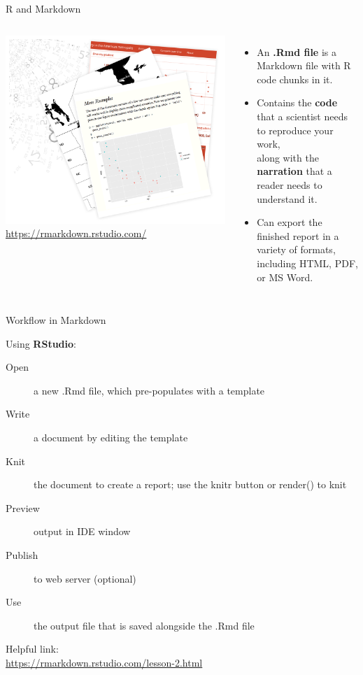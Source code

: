 \documentclass{beamer}
\begin{document}
\begin{frame}{R and Markdown}
\begin{columns}[t, onlytextwidth]

\vfill
\includegraphics[width=\textwidth]{markdown-examples.png}
\vfill
{\footnotesize \url{https://rmarkdown.rstudio.com/}}

    \begin{itemize}
        \item An \textbf{.Rmd file} is a Markdown file with R code chunks in it.
        \item Contains the \textbf{code} that a scientist needs to reproduce your work, \\ along with the \textbf{narration} that a reader needs to understand it.
        \item Can export the finished report in a variety of formats, including HTML, PDF, or MS Word.
    \end{itemize}

\end{columns}
\end{frame}

\begin{frame}{Workflow in Markdown}

Using \textbf{RStudio}:

\begin{description}
\item[Open] a new .Rmd file, which pre-populates with a template
\item[Write] a document by editing the template
\item[Knit] the document to create a report; use the knitr button or render() to knit
\item[Preview] output in IDE window
\item[Publish] to web server (optional)
\item[Use] the output file that is saved alongside the .Rmd file
\end{description}
\vfill
Helpful link: \\ \url{https://rmarkdown.rstudio.com/lesson-2.html}
\end{frame}
\end{document}
